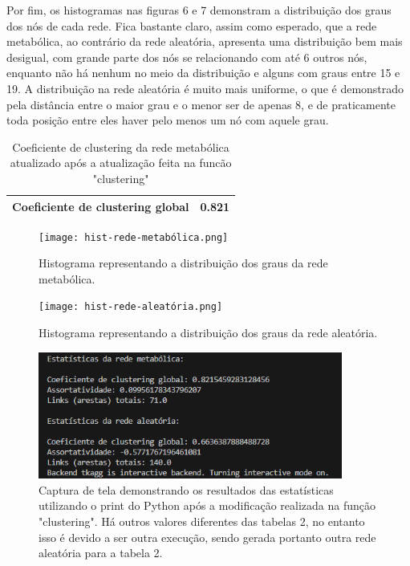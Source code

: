\documentclass[brazilian,12pt,a4paper,final]{article}
\begin{document}
	Por fim, os histogramas nas figuras 6 e 7 demonstram a distribuição dos graus dos nós de cada rede. Fica bastante claro, assim como esperado, que a rede metabólica, ao contrário da rede aleatória, apresenta uma distribuição bem mais desigual, com grande parte dos nós se relacionando com até 6 outros nós, enquanto não há nenhum no meio da distribuição e alguns com graus entre 15 e 19. A distribuição na rede aleatória é muito mais uniforme, o que é demonstrado pela distância entre o maior grau e o menor ser de apenas 8, e de praticamente toda posição entre eles haver pelo menos um nó com aquele grau.
	
	\begin{table}[]
		\begin{tabular}{|l|l|}
			\hline
			Coeficiente de clustering global & 0.821  \\ \hline
		\end{tabular}
		\caption{Coeficiente de clustering da rede metabólica atualizado após a atualização feita na funcão "clustering"}
	\end{table}
		
	\begin{figure}[hbtp]
		\begin{center}
			\texttt{[image: hist-rede-metabólica.png]}
			\caption{Histograma representando a distribuição dos graus da rede metabólica.}
			\label{fig}
		\end{center}
	\end{figure}
	
	\begin{figure}[hbtp]
		\begin{center}
			\texttt{[image: hist-rede-aleatória.png]}
			\caption{Histograma representando a distribuição dos graus da rede aleatória.}
			\label{fig}
		\end{center}
	\end{figure}
	
	\begin{figure}[hbtp]
		\begin{center}
			\includegraphics[width=10cm]{dadosAtualizados.png}
			\caption{Captura de tela demonstrando os resultados das estatísticas utilizando o print do Python após a modificação realizada na função "clustering". Há outros valores diferentes das tabelas 2, no entanto isso é devido a ser outra execução, sendo gerada portanto outra rede aleatória para a tabela 2.}
			\label{fig}
		\end{center}
	\end{figure}
	
	
	
	
	
	
	
	
	
	

	
	
\end{document}
